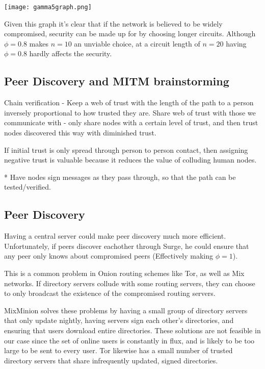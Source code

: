 \documentclass[twocolumn,11pt,english]{article}
\begin{document}
\texttt{[image: gamma5graph.png]}

Given this graph it's clear that if the network is believed to be widely compromised, security can be made up for by choosing longer circuits. Although $\phi = 0.8$ makes $n = 10$ an unviable choice, at a circuit length of $n=20$ having $\phi = 0.8$ hardly affects the security. 

\begin{comment}
  TODO: Apply PIR to obtain security guarantees even when $R \subset S$
\end{comment}

\subsection{Peer Discovery and MITM brainstorming}

Chain verification - Keep a web of trust with the length of the path to a person inversely proportional to how trusted they are. Share web of trust with those we communicate with - only share nodes with a certain level of trust, and then trust nodes discovered this way with diminished trust. 

If initial trust is only spread through person to person contact, then assigning negative trust is valuable because it reduces the value of colluding human nodes. 

* Have nodes sign messages as they pass through, so that the path can be tested/verified. 

\subsection{Peer Discovery}
Having a central server could make peer discovery much more efficient. Unfortunately, if peers discover eachother through Surge, he could ensure that any peer only knows about compromised peers (Effectively making $\phi = 1$).

This is a common problem in Onion routing schemes like Tor, as well as Mix networks. If directory servers collude with some routing servers, they can choose to only broadcast the existence of the compromised routing servers.

MixMinion \cite{minion-design} solves these problems by having a small group of directory servers that only update nightly, having servers sign each other's directories, and ensuring that users download entire directories. These solutions are not feasible in our case since the set of online users is constantly in flux, and is likely to be too large to be sent to every user. Tor \cite{tor-design} likewise has a small number of trusted directory servers that share infrequently updated, signed directories.
\end{document}
